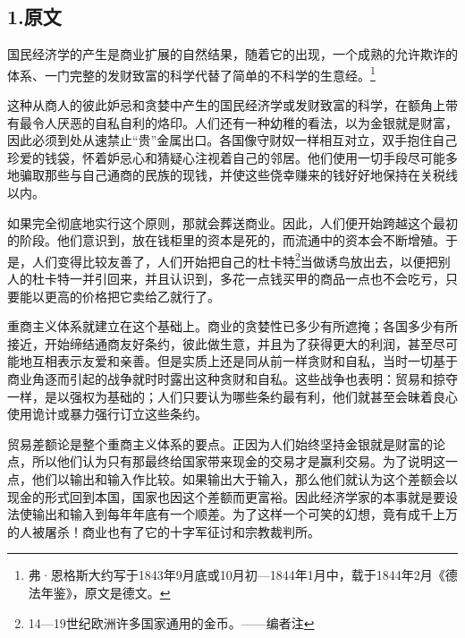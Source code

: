 \documentclass[a4paper,twoside,12pt,AutoFakeBold]{ctexart}
\begin{document}
\subsection{1.原文}

国民经济学的产生是商业扩展的自然结果，随着它的出现，一个成熟的允许欺诈的体系、一门完整的发财致富的科学代替了简单的不科学的生意经。\footnote{弗·恩格斯大约写于1843年9月底或10月初—1844年1月中，载于1844年2月《德法年鉴》，原文是德文。}

这种从商人的彼此妒忌和贪婪中产生的国民经济学或发财致富的科学，在额角上带有最令人厌恶的自私自利的烙印。人们还有一种幼稚的看法，以为金银就是财富，因此必须到处从速禁止“贵”金属出口。各国像守财奴一样相互对立，双手抱住自己珍爱的钱袋，怀着妒忌心和猜疑心注视着自己的邻居。他们使用一切手段尽可能多地骗取那些与自己通商的民族的现钱，并使这些侥幸赚来的钱好好地保持在关税线以内。

如果完全彻底地实行这个原则，那就会葬送商业。因此，人们便开始跨越这个最初的阶段。他们意识到，放在钱柜里的资本是死的，而流通中的资本会不断增殖。于是，人们变得比较友善了，人们开始把自己的杜卡特\footnote{14—19世纪欧洲许多国家通用的金币。——编者注 }当做诱鸟放出去，以便把别人的杜卡特一并引回来，并且认识到，多花一点钱买甲的商品一点也不会吃亏，只要能以更高的价格把它卖给乙就行了。

重商主义体系就建立在这个基础上。商业的贪婪性已多少有所遮掩；各国多少有所接近，开始缔结通商友好条约，彼此做生意，并且为了获得更大的利润，甚至尽可能地互相表示友爱和亲善。但是实质上还是同从前一样贪财和自私，当时一切基于商业角逐而引起的战争就时时露出这种贪财和自私。这些战争也表明：贸易和掠夺一样，是以强权为基础的；人们只要认为哪些条约最有利，他们就甚至会昧着良心使用诡计或暴力强行订立这些条约。

贸易差额论是整个重商主义体系的要点。正因为人们始终坚持金银就是财富的论点，所以他们认为只有那最终给国家带来现金的交易才是赢利交易。为了说明这一点，他们以输出和输入作比较。如果输出大于输入，那么他们就认为这个差额会以现金的形式回到本国，国家也因这个差额而更富裕。因此经济学家的本事就是要设法使输出和输入到每年年底有一个顺差。为了这样一个可笑的幻想，竟有成千上万的人被屠杀！商业也有了它的十字军征讨和宗教裁判所。
\end{document}
